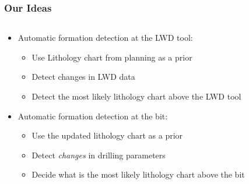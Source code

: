 \documentclass{beamer}
\begin{document}
\begin{frame} \frametitle{Our Ideas} 
\vspace{-1cm}

\begin{columns}[onlytextwidth]
\begin{column}{0.6\textwidth}

\begin{itemize}
\item<1-> Automatic formation detection at the LWD tool:
\begin{itemize}
\item<2-> Use Lithology chart from planning as a prior 
\item<3-> Detect changes in LWD data 
\item<4-> Detect the most likely lithology chart above the LWD tool
\end{itemize}

\item<5-> Automatic formation detection at the bit:
\begin{itemize}
\item<6-> Use the updated lithology chart as a prior
\item<7-> Detect \emph{changes} in drilling parameters
\item<8-> Decide what is the most likely lithology chart above the bit
\end{itemize}
\end{itemize}
 \end{column}

\begin{column}{0.4\textwidth}



\end{column}
\end{columns}
\end{frame}
\end{document}
